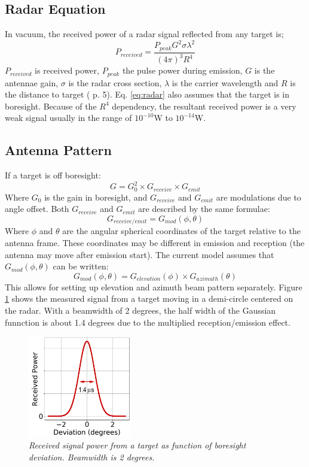 \documentclass[letterpaper]{book}
\begin{document}
\subsection{Radar Equation}
In vacuum, the received power of a radar signal reflected from any target is;
\begin{equation}\label{eq:radar}
P_{received} = \frac{P_{peak}G^{2}\sigma\lambda^{2}}{(4\pi)^{3}R^{4}}
\end{equation}
\(P_{received}\) is received power, \(P_{peak}\) the pulse power during emission, \(G\) is the antennae gain, \(\sigma\) is the radar cross section, \(\lambda\) is the carrier wavelength and \(R\) is the distance to target (\cite{ref:levanon} p. 5). Eq. \ref{eq:radar} also assumes that the target is in boresight. Because of the \(R^{4}\) dependency, the resultant received power is a very weak signal usually in the range of \(10^{-10}\)W to \(10^{-14}\)W. 

\subsection{Antenna Pattern}
If a target is off boresight:
\begin{equation}
G = G_{0}^{2} \times G_{receive} \times G_{emit}
\end{equation}
Where \(G_{0}\) is the gain in boresight, and \(G_{receive}\) and \(G_{emit}\) are modulations due to angle offset. Both \(G_{receive}\) and \(G_{emit}\) are described by the same formulae:
\begin{equation}
G_{receive/emit} = G_{mod}(\phi, \theta)
\end{equation}
Where \(\phi\) and \(\theta\) are the angular spherical coordinates of the target relative to the antenna frame. These coordinates may be different in emission and reception (the antenna may move after emission start). The current model assumes that \(G_{mod}(\phi, \theta)\) can be written:
\begin{equation}
G_{mod}(\phi, \theta) = G_{elevation}(\phi) \times G_{azimuth}(\theta)
\end{equation}
This allows for setting up elevation and azimuth beam pattern separately. Figure \ref{fig:beam_deviation} shows the measured signal from a target moving in a demi-circle centered on the radar. With a beamwidth of 2 degrees, the half width of the Gaussian funnction is about 1.4 degrees due to the multiplied reception/emission effect.

\begin{figure}
  \includegraphics[width=4.5cm]{Dev_Boresight_b.png}
  \caption{\textit{Received signal power from a target as function of boresight deviation. Beamwidth is 2 degrees.}}
  \label{fig:beam_deviation}
\end{figure}
\end{document}
